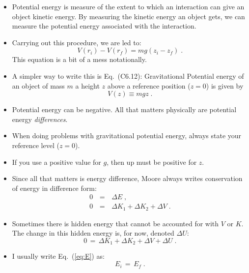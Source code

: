 \documentclass[12pt]{article}
\begin{document}
\begin{itemize}
\item Potential energy is measure of the extent to which an
interaction can give an object kinetic energy.  By measuring the
kinetic energy an object gets, we can measure the potential energy
associated with the interaction.
\item Carrying out this procedure, we are led to:
\begin{equation}
	V(r_i) - V(r_f) = mg(z_i - z_f) \;.
\end{equation}
This equation is a bit of a mess notationally.

\item A simpler way to write this is Eq.~(C6.12):  Gravitational
Potential energy of an object of mass $m$ a height $z$ above a
reference position ($z=0$) is given by 
\begin{equation}
V(z) \equiv mgz \;.
\end{equation}


\end{itemize}


\begin{itemize}
\item Potential energy can be negative.  All that matters physically
are potential energy {\em differences}. 
\item  When doing problems with gravitational potential energy, always
state your reference level ($z=0$).  
\item If you use a positive value for $g$, then up must be positive
for $z$. \\
\end{itemize}

\begin{itemize}
\item Since all that matters is energy difference, Moore always
writes conservation of energy in difference form:
\begin{eqnarray}
\label{eq:E}  0 \, &=& \, \Delta E \;, \\
              0 \, &=& \, \Delta K_1 + \Delta K_2 + \Delta V \;.  
\end{eqnarray}
\item Sometimes there is hidden energy that cannot be accounted for
  with $V$ or $K$.  The change in this hidden energy is, for now,
  denoted $\Delta U$:
\begin{equation}
    0 \, = \, \Delta K_1 + \Delta K_2 + \Delta V + \Delta U\;.  
\end{equation}
\item I usually write Eq.~(\ref{eq:E}) as:
\begin{equation}
  E_i \, = \, E_f \;.
\end{equation}
\end{itemize}



\end{document}

